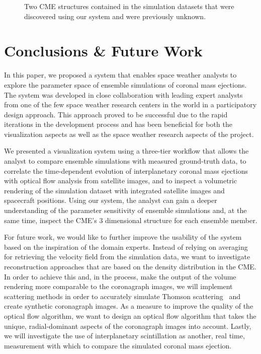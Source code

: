 \documentclass[journal]{vgtc}                %
\begin{document}
\begin{figure}
{}
\caption{Two CME structures contained in the simulation datasets that were discovered using our system and were previously unknown.}
\label{fig:cmestructure}
\end{figure}


\section{Conclusions \& Future Work} \label{sec:futurework}
In this paper, we proposed a system that enables space weather analysts to explore the parameter space of ensemble simulations of coronal mass ejections. The system was developed in close collaboration with leading expert analysts from one of the few space weather research centers in the world in a participatory design approach. This approach proved to be successful due to the rapid iterations in the development process and has been beneficial for both the visualization aspects as well as the space weather research aspects of the project.

We presented a visualization system using a three-tier workflow that allows the analyst to compare ensemble simulations with measured ground-truth data, to correlate the time-dependent evolution of interplanetary coronal mass ejections with optical flow analysis from satellite images, and to inspect a volumetric rendering of the simulation dataset with integrated satellite images and spacecraft positions. Using our system, the analyst can gain a deeper understanding of the parameter sensitivity of ensemble simulations and, at the same time, inspect the CME's 3 dimensional structure for each ensemble member.

For future work, we would like to further improve the usability of the system based on the inspiration of the domain experts. Instead of relying on averaging for retrieving the velocity field from the simulation data, we want to investigate reconstruction approaches that are based on the density distribution in the CME. In order to achieve this and, in the process, make the output of the volume rendering more comparable to the coronagraph images, we will implement scattering methods in order to accurately simulate Thomson scattering~\cite{howard2012thomson} and create synthetic coronagraph images. As a measure to improve the quality of the optical flow algorithm, we want to design an optical flow algorithm that takes the unique, radial-dominant aspects of the coronagraph images into account. Lastly, we will investigate the use of interplanetary scintillation as another, real time, measurement with which to compare the simulated coronal mass ejection.
\end{document}
